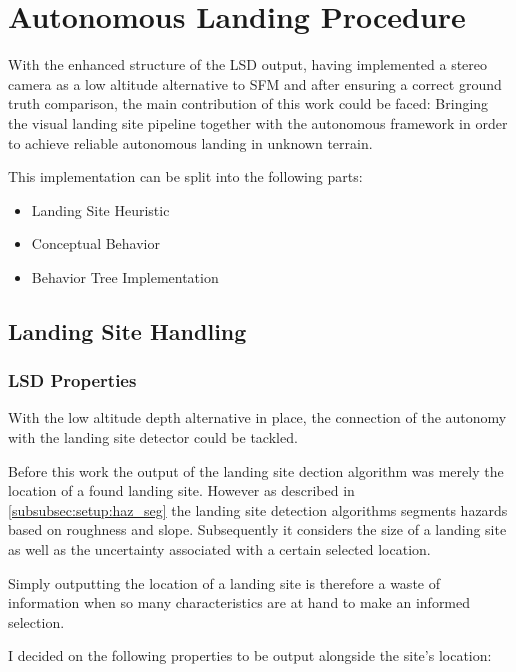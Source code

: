 \chapter{Autonomous Landing Procedure}\label{chapter:autonomous_landing_procedure}


With the enhanced structure of the LSD output, having implemented a stereo camera as a low altitude alternative to SFM and after ensuring a correct ground truth comparison, the main contribution of this work could be faced: Bringing the visual landing site pipeline together with the autonomous framework in order to achieve reliable autonomous landing in unknown terrain.

This implementation can be split into the following parts:
\begin{itemize}
    \item Landing Site Heuristic
    \item Conceptual Behavior
    \item Behavior Tree Implementation
\end{itemize}



\section{Landing Site Handling}\label{subsubsec:LandingSiteHeuristic}

\subsection{LSD Properties}\label{sec:LSproperties}

With the low altitude depth alternative in place, the connection of the autonomy with the landing site detector could be tackled. 

Before this work the output of the landing site dection algorithm was merely the location of a found landing site. However as described in \cref{subsubsec:setup:haz_seg} the landing site detection algorithms segments hazards based on roughness and slope. Subsequently it considers the size of a landing site as well as the uncertainty associated with a certain selected location. 

Simply outputting the location of a landing site is therefore a waste of information when so many characteristics are at hand to make an informed selection. 

I decided on the following properties to be output alongside the site's location:

